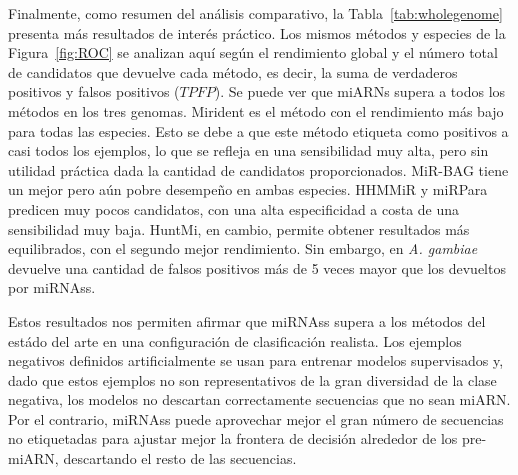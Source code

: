 Finalmente, como resumen del análisis comparativo, la Tabla~\ref{tab:wholegenome} presenta más resultados de interés práctico. Los mismos métodos y especies de
la Figura~\ref{fig:ROC} se analizan aquí según el rendimiento global y el número total de candidatos que devuelve cada método, es decir, la suma de verdaderos
positivos y falsos positivos ($TPFP$). Se puede ver que miARNs supera a todos los métodos en los tres genomas. Mirident es el método con el rendimiento más bajo
para todas las especies. Esto se debe a que este método etiqueta como positivos a casi todos los ejemplos, lo que se refleja en una sensibilidad muy alta, pero
sin utilidad práctica dada la cantidad de candidatos proporcionados. MiR-BAG tiene un mejor pero aún pobre desempeño en ambas especies. HHMMiR y miRPara
predicen muy pocos candidatos, con una alta especificidad a costa de una sensibilidad muy baja.  HuntMi, en cambio, permite obtener resultados más equilibrados,
con el segundo mejor rendimiento. Sin embargo, en \textit{A. gambiae} devuelve una cantidad de falsos positivos más de 5 veces mayor que los devueltos por
miRNAss.

Estos resultados nos permiten afirmar que miRNAss supera a los métodos del estádo del arte en una configuración de clasificación realista. Los ejemplos
negativos definidos artificialmente se usan para entrenar modelos supervisados y, dado que estos ejemplos no son representativos de la gran diversidad de
la clase negativa, los modelos no descartan correctamente secuencias que no sean miARN. Por el contrario, miRNAss puede aprovechar mejor el gran número de
secuencias no etiquetadas para ajustar mejor la frontera de decisión alrededor de los pre-miARN, descartando el resto de las secuencias.

